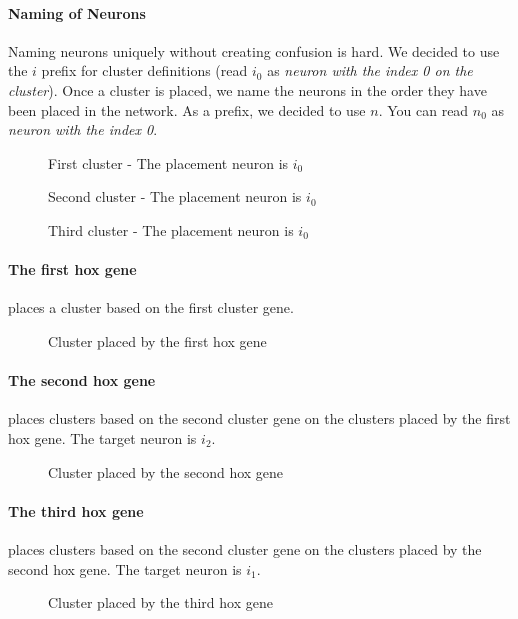 \paragraph{Naming of Neurons}
Naming neurons uniquely without creating confusion is hard. We decided to use the $i$ prefix for cluster definitions (read $i_0$ as \emph{neuron with the index 0 on the cluster}).
Once a cluster is placed, we name the neurons in the order they have been placed in the network. As a prefix, we decided to use $n$. You can read $n_0$ as \emph{neuron with the index 0}.

\begin{figure}[H]
    \centering
    
    \caption{First cluster - The placement neuron is $i_0$}
\end{figure}
\begin{figure}[H]
    \centering
    
    \caption{Second cluster - The placement neuron is $i_0$}
\end{figure}
\begin{figure}[H]
    \centering
    
    \caption{Third cluster - The placement neuron is $i_0$}
\end{figure}

\paragraph{The first hox gene} places a cluster based on the first cluster gene.
\FloatBarrier
\begin{figure}[H]
    \centering
    
    \caption{Cluster placed by the first hox gene}
\end{figure}
\FloatBarrier

\newpage

\paragraph{The second hox gene} places clusters based on the second cluster gene on the clusters placed by the first hox gene.
The target neuron is $i_2$.
\begin{figure}[H]
    \centering
    
    \caption{Cluster placed by the second hox gene}
\end{figure}

\paragraph{The third hox gene} places clusters based on the second cluster gene on the clusters placed by the second hox gene.
The target neuron is $i_1$.
\begin{figure}[H]
    \centering
    
    \caption{Cluster placed by the third hox gene}
\end{figure}

